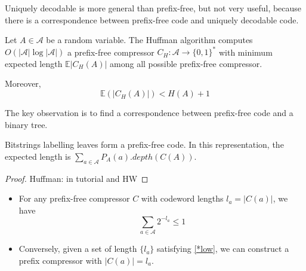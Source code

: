Uniquely decodable is more general than prefix-free, but not very useful, because there is a correspondence between prefix-free code and uniquely decodable code.

\begin{thm}
Let $A\in \mathcal{A}$ be a random variable. The Huffman algorithm computes $O(|\mathcal{A}|\log|\mathcal{A}|)$ a prefix-free compressor $C_H:\mathcal{A}\to \{0,1\}^*$ with minimum expected length $\mathbb{E}|C_H(A)|$ among all possible prefix-free compressor.

Moreover,
\begin{equation*}
\mathbb{E}(|C_H(A)|) < H(A)+1
\end{equation*}
\end{thm}

The key observation is to find a correspondence between prefix-free code and a binary tree.



Bitstrings labelling leaves form a prefix-free code. In this representation, the expected length is $\sum_{a\in \mathcal{A}}P_A(a).depth(C(A))$.

\begin{proof}
Huffman: in tutorial and HW
\end{proof}


\begin{lemma}
\begin{itemize}
\item For any prefix-free compressor $C$ with codeword lengths $l_a=|C(a)|$, we have \begin{equation*}
\tag{*}
\label{*low}
\sum_{a\in \mathcal{A}} 2^{-l_a}\leq 1
\end{equation*}
\item Conversely, given a set of length $\{l_a\}$ satisfying \eqref{*low}, we can construct a prefix compressor with $|C(a)|=l_a$.
\end{itemize}
\end{lemma}

